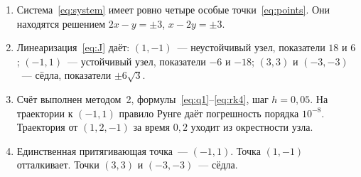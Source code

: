 \documentclass[12pt,a4paper]{article}
\begin{document}
\begin{enumerate}
  \item Система~\eqref{eq:system} имеет ровно четыре особые точки~\eqref{eq:points}. Они находятся решением \(2x-y = \pm 3\), \(x-2y = \pm 3\).
  \item Линеаризация~\eqref{eq:J} даёт:
  \((1,-1)\)~--- неустойчивый узел, показатели \(18\) и \(6\);
  \((-1,1)\)~--- устойчивый узел, показатели \(-6\) и \(-18\);
  \((3,3)\) и \((-3,-3)\)~--- сёдла, показатели \(\pm 6\sqrt{3}\).
  \item Счёт выполнен методом~2, формулы~\eqref{eq:q1}--\eqref{eq:rk4},
  шаг \(h = 0{,}05\).
  На траектории к \((-1,1)\) правило Рунге даёт погрешность порядка \(10^{-8}\).
  Траектория от \((1{,}2,-1)\) за время \(0{,}2\) уходит из окрестности узла.
  \item Единственная притягивающая точка~--- \((-1,1)\).
  Точка \((1,-1)\) отталкивает.
  Точки \((3,3)\) и \((-3,-3)\)~--- сёдла.
\end{enumerate}
\end{document}

